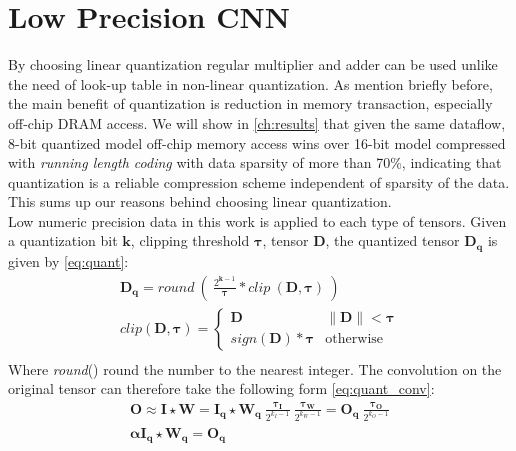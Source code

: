  
\section{Low Precision CNN}
By choosing linear quantization regular multiplier and adder can be used unlike the need of look-up table in non-linear quantization. As mention briefly before, the main benefit of quantization is reduction in memory transaction, especially off-chip DRAM access. We will show in \autoref{ch:results} that given the same dataflow, 8-bit quantized model off-chip memory access wins over 16-bit model compressed with \textit{running length coding} with data sparsity of more than 70\%, indicating that quantization is a reliable compression scheme independent of sparsity of the data. This sums up our reasons behind choosing linear quantization. \\
Low numeric precision data in this work is applied to each type of tensors. Given a quantization bit $\boldsymbol{k}$, clipping threshold $\boldsymbol{\tau}$, tensor $\boldsymbol{D}$, the quantized tensor $\boldsymbol{D_q}$ is given by \autoref{eq:quant}:
\begin{equation}
    \begin{aligned}\label{eq:quant}
        \boldsymbol{D_q}=
        \textit{round}\ (\ \frac{2^{\boldsymbol{k}-1}}{\boldsymbol{\tau}}*\textit{clip}\ (\boldsymbol{D},\boldsymbol{\tau})
        \ ) \\
        \textit{clip}(\boldsymbol{D},\boldsymbol{\tau})=\begin{cases}
            \boldsymbol{D} &\|\boldsymbol{D}\|<\boldsymbol{\tau} \\
            \textit{sign}(\boldsymbol{D})*\boldsymbol{\tau} &\text{otherwise}
        \end{cases} \\
    \end{aligned}
\end{equation}
Where \textit{round}() round the number to the nearest integer. The convolution on the original tensor can therefore take the following form \autoref{eq:quant_conv}:
\begin{equation}
    \begin{aligned}\label{eq:quant_conv}
        \boldsymbol{O}\approx\boldsymbol{I}\star\boldsymbol{W}= \boldsymbol{I_q}\star\boldsymbol{W_q}
        \ \frac{\boldsymbol{\tau_I}}{2^{k_I-1}}
        \ \frac{\boldsymbol{\tau_W}}{2^{k_W-1}}
        =\boldsymbol{O_q}\  \frac{\boldsymbol{\tau_O}}{2^{k_O-1}} \\
        \boldsymbol{\alpha}\boldsymbol{I_q}\star\boldsymbol{W_q}=\boldsymbol{O_q}
    \end{aligned}
\end{equation}
